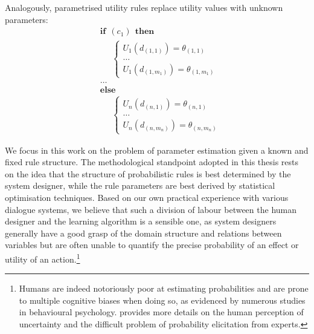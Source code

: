 Analogously, parametrised utility rules replace utility values with unknown parameters:
\begin{equation}
\begin{aligned}
& \textbf{if} \ \ (c_{1}) \ \ \textbf{then} \\ 
& \;\;\;\;\; \begin{cases}
U_1(d_{(1,1)}) = \theta_{(1,1)} \\
 \dots \\
U_1(d_{(1,m_1)}) = \theta_{(1,m_1)}
\end{cases} \\[3mm]
& \dots  \\
& \textbf{else} \\
& \;\;\;\;\; \begin{cases}
U_n(d_{(n,1)}) = \theta_{(n,1)} \\
\dots \\
U_n(d_{(n,m_n)}) = \theta_{(n,m_n)}
\end{cases}
\end{aligned}
\end{equation} 

We focus in this work on the problem of parameter estimation given a known and fixed rule structure.  The methodological standpoint adopted in this thesis rests on the idea that the structure of probabilistic rules is best determined by the system designer, while the rule parameters are best derived by statistical optimisation techniques. Based on our own practical experience with various dialogue systems, we believe that such a division of labour between the human designer and the learning algorithm is a sensible one, as system designers generally have a good grasp of the domain structure and relations between variables but are often unable to quantify the precise probability of an effect or utility of an action.\footnote{Humans are indeed notoriously poor at estimating probabilities and are prone to multiple cognitive biases when doing so, as evidenced by numerous studies in behavioural psychology.  \cite{ohagan2006} provides more details on the human perception of uncertainty and the difficult problem of probability elicitation from experts.}

